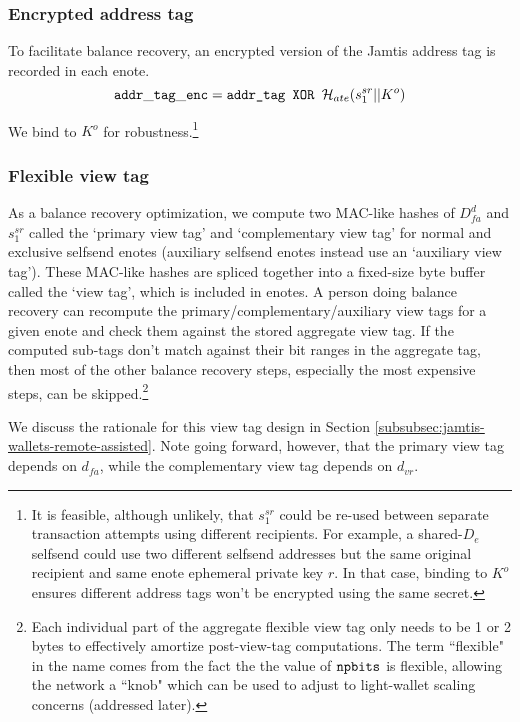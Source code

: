\subsubsection{Encrypted address tag}
\label{subsubsec:jamtis-enote-construction-encrypted-addr-tag}

To facilitate balance recovery, an encrypted version of the Jamtis address tag is recorded in each enote.
\[ {\tt addr\_tag\_enc} = \textrm{\tt addr\_tag XOR } \mathcal{H}_{ate}(s^{sr}_1 || K^o) \]

We bind to $K^o$ for robustness.\footnote{It is feasible, although unlikely, that $s^{sr}_1$ could be re-used between separate transaction attempts using different recipients. For example, a shared-$D_e$ selfsend could use two different selfsend addresses but the same original recipient and same enote ephemeral private key $r$. In that case, binding to $K^o$ ensures different address tags won't be encrypted using the same secret.}

\subsubsection{Flexible view tag}
\label{subsubsec:jamtis-enote-construction-view-tag}

As a balance recovery optimization, we compute two MAC-like hashes of $D^d_{fa}$ and $s^{sr}_1$ called the `primary view tag' and `complementary view tag' \cite{reduce-scan-times-view-tag-research-issue-73} for normal and exclusive selfsend enotes (auxiliary selfsend enotes instead use an `auxiliary view tag'). These MAC-like hashes are spliced together into a fixed-size byte buffer called the `view tag', which is included in enotes. A person doing balance recovery can recompute the primary/complementary/auxiliary view tags for a given enote and check them against the stored aggregate view tag. If the computed sub-tags don't match against their bit ranges in the aggregate tag, then most of the other balance recovery steps, especially the most expensive steps, can be skipped.\footnote{Each individual part of the aggregate flexible view tag only needs to be 1 or 2 bytes to effectively amortize post-view-tag computations. The term ``flexible" in the name comes from the fact the the value of ${\tt npbits}$ is flexible, allowing the network a ``knob" which can be used to adjust to light-wallet scaling concerns (addressed later).}

We discuss the rationale for this view tag design in Section \ref{subsubsec:jamtis-wallets-remote-assisted}. Note going forward, however, that the primary view tag depends on $d_{fa}$, while the complementary view tag depends on $d_{vr}$.

